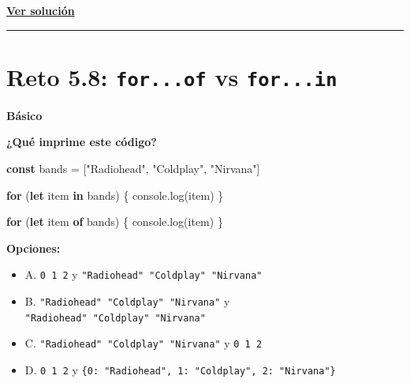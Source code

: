 \documentclass[
  letterpaper,
  DIV=11,
  numbers=noendperiod]{scrreprt}
\newenvironment{Shaded}{\begin{snugshade}}{\end{snugshade}}
\newcommand{\BuiltInTok}[1]{\textcolor[rgb]{0.00,0.23,0.31}{#1}}
\newcommand{\ControlFlowTok}[1]{\textcolor[rgb]{0.00,0.23,0.31}{\textbf{#1}}}
\newcommand{\FunctionTok}[1]{\textcolor[rgb]{0.28,0.35,0.67}{#1}}
\newcommand{\KeywordTok}[1]{\textcolor[rgb]{0.00,0.23,0.31}{\textbf{#1}}}
\newcommand{\NormalTok}[1]{\textcolor[rgb]{0.00,0.23,0.31}{#1}}
\newcommand{\OperatorTok}[1]{\textcolor[rgb]{0.37,0.37,0.37}{#1}}
\newcommand{\StringTok}[1]{\textcolor[rgb]{0.13,0.47,0.30}{#1}}
\providecommand{\tightlist}{%
  \setlength{\itemsep}{0pt}\setlength{\parskip}{0pt}}
\begin{document}
\textbf{\hyperref[sec-sol-cap5-reto7]{Ver solución}}

\begin{center}\rule{0.5\linewidth}{0.5pt}\end{center}

\section{\texorpdfstring{Reto 5.8: \texttt{for...of} vs
\texttt{for...in}}{Reto 5.8: for...of vs for...in}}\label{sec-cap5-reto8}

\begin{tcolorbox}[enhanced jigsaw, left=2mm, toprule=.15mm, leftrule=.75mm, breakable, colback=white, coltitle=black, bottomtitle=1mm, arc=.35mm, rightrule=.15mm, colframe=quarto-callout-caution-color-frame, opacitybacktitle=0.6, toptitle=1mm, opacityback=0, titlerule=0mm, title=\textcolor{quarto-callout-caution-color}{\faFire}\hspace{0.5em}{Dificultad}, bottomrule=.15mm, colbacktitle=quarto-callout-caution-color!10!white]

\textbf{Básico}

\end{tcolorbox}

\textbf{¿Qué imprime este código?}

\begin{Shaded}
\begin{Highlighting}[]
\KeywordTok{const}\NormalTok{ bands }\OperatorTok{=}\NormalTok{ [}\StringTok{"Radiohead"}\OperatorTok{,} \StringTok{"Coldplay"}\OperatorTok{,} \StringTok{"Nirvana"}\NormalTok{]}

\ControlFlowTok{for}\NormalTok{ (}\KeywordTok{let}\NormalTok{ item }\KeywordTok{in}\NormalTok{ bands) \{}
  \BuiltInTok{console}\OperatorTok{.}\FunctionTok{log}\NormalTok{(item)}
\NormalTok{\}}

\ControlFlowTok{for}\NormalTok{ (}\KeywordTok{let}\NormalTok{ item }\KeywordTok{of}\NormalTok{ bands) \{}
  \BuiltInTok{console}\OperatorTok{.}\FunctionTok{log}\NormalTok{(item)}
\NormalTok{\}}
\end{Highlighting}
\end{Shaded}

\textbf{Opciones:}

\begin{itemize}
\tightlist
\item
  A. \texttt{0\ 1\ 2} y \texttt{"Radiohead"\ "Coldplay"\ "Nirvana"}
\item
  B. \texttt{"Radiohead"\ "Coldplay"\ "Nirvana"} y
  \texttt{"Radiohead"\ "Coldplay"\ "Nirvana"}
\item
  C. \texttt{"Radiohead"\ "Coldplay"\ "Nirvana"} y \texttt{0\ 1\ 2}
\item
  D. \texttt{0\ 1\ 2} y
  \texttt{\{0:\ "Radiohead",\ 1:\ "Coldplay",\ 2:\ "Nirvana"\}}
\end{itemize}
\end{document}
